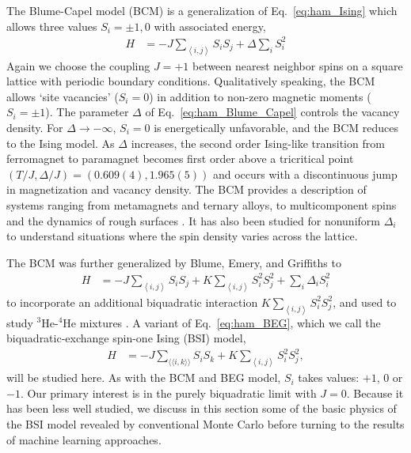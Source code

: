 \documentclass[pra,letterpaper,10pt,twocolumn]{revtex4}
\begin{document}

The Blume-Capel model (BCM) is a generalization of
Eq.~\ref{eq:ham_Ising} which allows three values $S_i=\pm 1,0$ with
associated energy, 
\begin{align} H &=
-J\sum_{\left\langle i,j \right\rangle} S_iS_j + 
\Delta \sum_i S^2_i
\label{eq:ham_Blume_Capel} 
\end{align} 
Again we choose the coupling $J=+1$ between nearest neighbor spins on a
square lattice with periodic boundary conditions.  Qualitatively
speaking, the BCM allows `site vacancies' ($S_i=0$) in addition to
non-zero magnetic moments ($S_i=\pm 1$).  The parameter $\Delta$ of
Eq.~\ref{eq:ham_Blume_Capel} controls the vacancy density. For $\Delta
\rightarrow -\infty$, $S_i = 0$ is energetically unfavorable, and the
BCM reduces to the Ising model.  As $\Delta$ increases, the second order
Ising-like transition from ferromagnet to paramagnet becomes first order
above a tricritical point $(T/J,\Delta/J)=(0.609(4),1.965(5))$
\cite{Plascak98} and occurs with a discontinuous jump in magnetization
and vacancy density.  The BCM provides a description of systems ranging
from metamagnets and ternary alloys, to multicomponent spins  and the
dynamics of rough surfaces
\cite{BEG,MukamelBlume74,Lajzerowicz75,Newman83,Zahraouy04,Brito07}.  It
has also been studied for nonuniform $\Delta_i$ \cite{Pittman08} to
understand situations where the spin density varies across the lattice.



The BCM was further generalized by Blume, Emery, and Griffiths to
\begin{align}
H &= -J \sum_{\left\langle i,j \right\rangle} S_i S_j + K \sum_{\left\langle i,j \right\rangle} S_i^2 S_j^2 + \sum_i\Delta_i S_i^2  
\label{eq:ham_BEG}
\end{align}
to incorporate an additional biquadratic interaction $K
\sum_{\left\langle i,j \right\rangle} S_i^2 S_j^2$,  and used to study
$^3$He-$^4$He mixtures \cite{BEG}.  A variant of Eq.~\ref{eq:ham_BEG},
which we call the biquadratic-exchange spin-one Ising (BSI) model, 
\begin{align}
H &= -J \sum_{\langle\langle i,k \rangle\rangle} S_i S_k 
+ K \sum_{\left\langle i,j \right\rangle} S_i^2 S_j^2,
\label{eq:ham_BSI}
\end{align}
will be studied here.  As with the BCM and BEG model, $S_i$ takes
values: $+1$, $0$ or $-1$.  Our primary interest is in the purely
biquadratic limit with $J=0$.  Because it has been less well studied, we
discuss in this section some of the basic physics of the BSI model
revealed by conventional Monte Carlo before turning to the results of
machine learning approaches.
\end{document}
